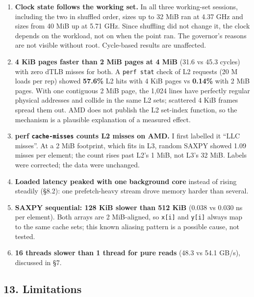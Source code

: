 \documentclass[10pt,letterpaper]{article}
\providecommand{\tightlist}{\setlength{\itemsep}{0pt}\setlength{\parskip}{0pt}}
\begin{document}
\begin{enumerate}
\def\labelenumi{\arabic{enumi}.}
\tightlist
\item
  \textbf{Clock state follows the working set.} In all three
  working-set sessions, including the two in shuffled order,
  sizes up to 32 MiB ran at 4.37 GHz and sizes from 40 MiB
  up at 5.71 GHz. Since shuffling did not change it, the
  clock depends on the workload, not on when the point ran.
  The governor's reasons are not visible without root.
  Cycle-based results are unaffected.
\item
  \textbf{4 KiB pages faster than 2 MiB pages at 4 MiB}
  (31.6 vs 45.3 cycles) with zero dTLB misses for both. A
  \texttt{perf\ stat} check of L2 requests (20 M loads per
  rep) showed \textbf{57.6\%} L2 hits with 4 KiB pages vs
  \textbf{0.14\%} with 2 MiB pages. With one contiguous 2
  MiB page, the 1,024 lines have perfectly regular physical
  addresses and collide in the same L2 sets; scattered 4 KiB
  frames spread them out. AMD does not publish the L2
  set-index function, so the mechanism is a plausible
  explanation of a measured effect.
\item
  \textbf{perf \texttt{cache-misses} counts L2 misses on
  AMD.} I first labelled it ``LLC misses''. At a 2 MiB
  footprint, which fits in L3, random SAXPY showed 1.09
  misses per element; the count rises past L2's 1 MiB, not
  L3's 32 MiB. Labels were corrected; the data were
  unchanged.
\item
  \textbf{Loaded latency peaked with one background core}
  instead of rising steadily (§8.2): one prefetch-heavy
  stream drove memory harder than several.
\item
  \textbf{SAXPY sequential: 128 KiB slower than 512 KiB}
  (0.038 vs 0.030 ns per element). Both arrays are 2
  MiB-aligned, so \texttt{x{[}i{]}} and \texttt{y{[}i{]}}
  always map to the same cache sets; this known aliasing
  pattern is a possible cause, not tested.
\item
  \textbf{16 threads slower than 1 thread for pure reads}
  (48.3 vs 54.1 GB/s), discussed in §7.
\end{enumerate}

\hypertarget{limitations}{%
\subsection{13. Limitations}\label{limitations}}
\end{document}

